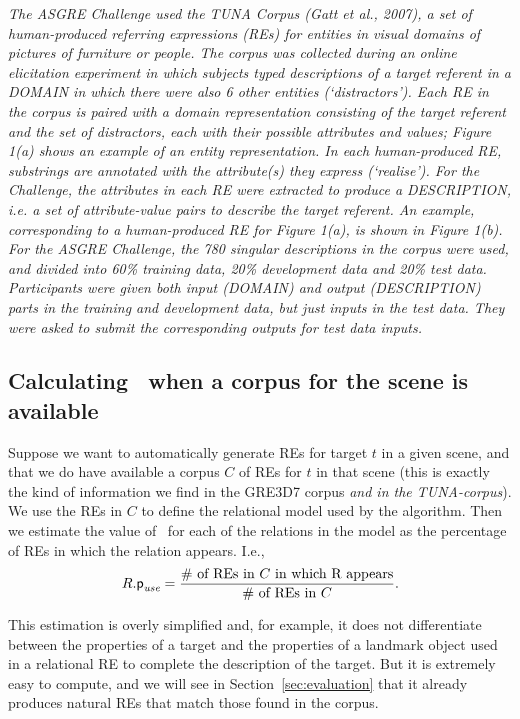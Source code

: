 \textit{The ASGRE Challenge used the TUNA Corpus (Gatt
et al., 2007), a set of human-produced referring expressions (REs) for entities in visual domains of
pictures of furniture or people. The corpus was
collected during an online elicitation experiment in
which subjects typed descriptions of a target referent
in a DOMAIN in which there were also 6 other entities (‘distractors’). Each RE in the corpus is paired
with a domain representation consisting of the target referent and the set of distractors, each with their
possible attributes and values; Figure 1(a) shows an
example of an entity representation.
In each human-produced RE, substrings are annotated with the attribute(s) they express (‘realise’).
For the Challenge, the attributes in each RE were
extracted to produce a DESCRIPTION, i.e. a set of attribute-value pairs to describe the target referent.
An example, corresponding to a human-produced
RE for Figure 1(a), is shown in Figure 1(b).
For the ASGRE Challenge, the 780 singular descriptions in the corpus were used, and divided
into 60\% training data, 20\% development data and
20\% test data. Participants were given both input
(DOMAIN) and output (DESCRIPTION) parts in the
training and development data, but just inputs in the
test data. They were asked to submit the corresponding outputs for test data inputs.}


\subsection{Calculating \puse\ when a corpus for the scene is available}

Suppose we want to automatically generate REs for target $t$ in a given scene, and that we do have available a corpus $C$ 
of REs for $t$ in that scene (this is exactly the kind of information we find in the GRE3D7 corpus \textit{and in the TUNA-corpus}).  
We use the REs in $C$ to define the relational model 
used by the algorithm.  Then we estimate the value of \puse\ for each of the relations in the model as the percentage of REs 
in which the relation appears.  I.e., 
\begin{equation}\label{eq1}
R.\textsf{p}_\textit{use} = \frac{\# \mbox{ of REs in $C$ in which R appears}}{\# \mbox{ of REs in $C$}}.
\end{equation}

\noindent
This estimation is overly simplified and, for example, it does not differentiate between the properties of a target and the 
properties of a landmark object used in a relational RE to complete the description of the target.  But it is extremely easy 
to compute, and we will see in Section~\ref{sec:evaluation} that it already produces natural REs that match those found in the corpus. 

